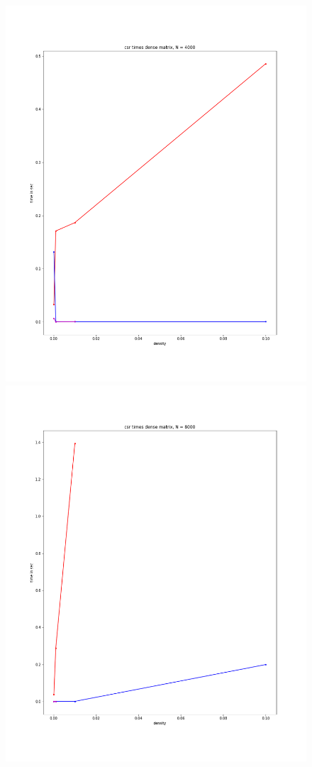 \documentclass[12pt]{article}
\begin{document}
\begin{figure}[h]
  \includegraphics[scale = 0.16]{csr_dm_4000.png}
  \includegraphics[scale = 0.16]{csr_dm_8000.png}

\end{figure}
\end{document}
